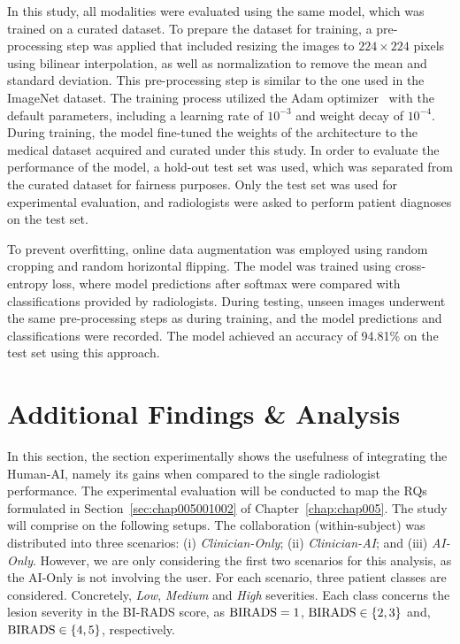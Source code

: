 In this study, all modalities were evaluated using the same model, which was trained on a curated dataset.
To prepare the dataset for training, a pre-processing step was applied that included resizing the images to $224\times 224$ pixels using bilinear interpolation, as well as normalization to remove the mean and standard deviation.
This pre-processing step is similar to the one used in the ImageNet dataset. The training process utilized the Adam optimizer~\cite{CALISTO2022102285} with the default parameters, including a learning rate of $10^{-3}$ and weight decay of $10^{-4}$.
During training, the model fine-tuned the weights of the architecture to the medical dataset acquired and curated under this study.
In order to evaluate the performance of the model, a hold-out test set was used, which was separated from the curated dataset for fairness purposes.
Only the test set was used for experimental evaluation, and radiologists were asked to perform patient diagnoses on the test set.

To prevent overfitting, online data augmentation was employed using random cropping and random horizontal flipping.
The model was trained using cross-entropy loss, where model predictions after softmax were compared with classifications provided by radiologists.
During testing, unseen images underwent the same pre-processing steps as during training, and the model predictions and classifications were recorded.
The model achieved an accuracy of 94.81\% on the test set using this approach.

\section{Additional Findings \& Analysis}
\label{sec:app003004}

In this section, the section experimentally shows the usefulness of integrating the Human-\ac{AI}, namely its gains when compared to the single radiologist performance.
The experimental evaluation will be conducted to map the \acp{RQ} formulated in Section~\ref{sec:chap005001002} of Chapter~\ref{chap:chap005}.
The study will comprise on the following setups.
The collaboration (within-subject) was distributed into three scenarios: (i) {\it Clinician-Only}; (ii) {\it Clinician-AI}; and (iii) {\it AI-Only}.
However, we are only considering the first two scenarios for this analysis, as the AI-Only is not involving the user.
For each scenario, three patient classes are considered.
Concretely, {\it Low}, {\it Medium} and {\it High} severities.
Each class concerns the lesion severity in the \ac{BI-RADS} score, as ${\rm BIRADS} = 1$, ${\rm BIRADS} \in\{2, 3\}$ and, ${\rm BIRADS}\in\{4, 5\}$, respectively.

